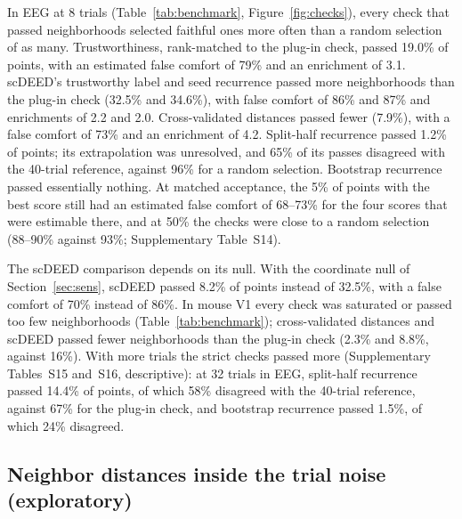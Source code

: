 \documentclass[11pt]{article}
\newcommand{\MouseNFeight}{16}
\newcommand{\EegRandEight}{93}
\newcommand{\EegRandDeepEight}{96}
\newcommand{\BmTWPass}{19.0}
\newcommand{\BmTWFC}{79}
\newcommand{\BmTWEnrich}{3.1}
\newcommand{\BmSCDPass}{32.5}
\newcommand{\BmSCDFC}{86}
\newcommand{\BmSCDEnrich}{2.2}
\newcommand{\BmSCDAltPass}{8.2}
\newcommand{\BmSCDAltFC}{70}
\newcommand{\BmCVPass}{7.9}
\newcommand{\BmCVFC}{73}
\newcommand{\BmCVEnrich}{4.2}
\newcommand{\BmSEEDPass}{34.6}
\newcommand{\BmSEEDFC}{87}
\newcommand{\BmSEEDEnrich}{2.0}
\newcommand{\BmSHPass}{1.2}
\newcommand{\BmSHD}{65}
\newcommand{\BmFiveLo}{68}
\newcommand{\BmFiveHi}{73}
\newcommand{\BmFiftyLo}{88}
\newcommand{\BmFiftyHi}{90}
\newcommand{\BmSHDThirtyTwo}{58}
\newcommand{\BmNDThirtyTwo}{67}
\newcommand{\BmBOOTPassThirtyTwo}{1.5}
\newcommand{\BmBOOTDThirtyTwo}{24}
\newcommand{\BmSHPassThirtyTwo}{14.4}
\newcommand{\ChkMousePassCV}{2.3}
\newcommand{\ChkMousePassSCD}{8.8}
\begin{document}
In EEG at 8 trials (Table~\ref{tab:benchmark}, Figure~\ref{fig:checks}), every check that passed neighborhoods selected faithful ones more often than a random selection of as many.
Trustworthiness, rank-matched to the plug-in check, passed \BmTWPass\% of points, with an estimated false comfort of \BmTWFC\% and an enrichment of \BmTWEnrich.
scDEED's trustworthy label and seed recurrence passed more neighborhoods than the plug-in check (\BmSCDPass\% and \BmSEEDPass\%), with false comfort of \BmSCDFC\% and \BmSEEDFC\% and enrichments of \BmSCDEnrich{} and \BmSEEDEnrich.
Cross-validated distances passed fewer (\BmCVPass\%), with a false comfort of \BmCVFC\% and an enrichment of \BmCVEnrich.
Split-half recurrence passed \BmSHPass\% of points; its extrapolation was unresolved, and \BmSHD\% of its passes disagreed with the 40-trial reference, against \EegRandDeepEight\% for a random selection.
Bootstrap recurrence passed essentially nothing.
At matched acceptance, the 5\% of points with the best score still had an estimated false comfort of \BmFiveLo--\BmFiveHi\% for the four scores that were estimable there, and at 50\% the checks were close to a random selection (\BmFiftyLo--\BmFiftyHi\% against \EegRandEight\%; Supplementary Table~S14).

The scDEED comparison depends on its null.
With the coordinate null of Section~\ref{sec:sens}, scDEED passed \BmSCDAltPass\% of points instead of \BmSCDPass\%, with a false comfort of \BmSCDAltFC\% instead of \BmSCDFC\%.
In mouse V1 every check was saturated or passed too few neighborhoods (Table~\ref{tab:benchmark}); cross-validated distances and scDEED passed fewer neighborhoods than the plug-in check (\ChkMousePassCV\% and \ChkMousePassSCD\%, against \MouseNFeight\%).
With more trials the strict checks passed more (Supplementary Tables~S15 and~S16, descriptive): at 32 trials in EEG, split-half recurrence passed \BmSHPassThirtyTwo\% of points, of which \BmSHDThirtyTwo\% disagreed with the 40-trial reference, against \BmNDThirtyTwo\% for the plug-in check, and bootstrap recurrence passed \BmBOOTPassThirtyTwo\%, of which \BmBOOTDThirtyTwo\% disagreed.

\subsection{Neighbor distances inside the trial noise (exploratory)}\label{sec:why}
\end{document}
